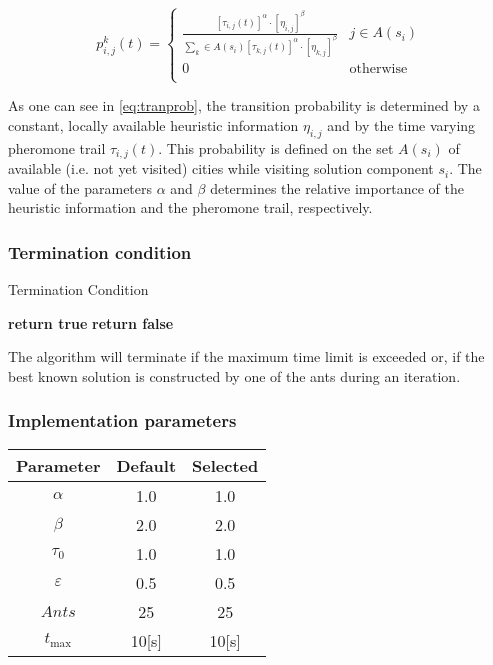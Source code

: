 \begin{homeworkProblem}
\begin{equation} 
p_{i,j}^k(t) = \begin{cases}
  \frac{[\tau_{i,j}(t)]^\alpha \cdot [\eta_{i,j}]^\beta}{\sum_{k} \in A(s_{i}) [\tau_{k,j}(t)]^\alpha \cdot [\eta_{k,j}]^\beta} & j \in A(s_{i}) \\
 0 & \text{otherwise} \\
\end{cases}
\end{equation}

As one can see in \ref{eq:tranprob}, the transition probability is determined by a constant, locally available heuristic information $\eta_{i,j}$ and by the time varying pheromone trail $\tau_{i,j}(t)$.
This probability is defined on the set $A(s_i)$ of available (i.e. not yet visited) cities while visiting solution component $s_i$.
The value of the parameters $\alpha$ and $\beta$ determines the relative importance of the heuristic information and the pheromone trail, respectively.

\subsubsection{Termination condition}
\begin{algorithm}[!h]
  \caption{Termination Condition}\label{termcond}
  \begin{algorithmic}[1]
				    \State \textbf{return true}
			    \EndIf
      \State \textbf{return false}
    \EndProcedure
\end{algorithmic}
\end{algorithm}

The algorithm will terminate if the maximum time limit is exceeded or, if the best known solution is constructed by one of the ants during an iteration.

\subsubsection{Implementation parameters}
\begin{center}
\begin{tabular}{|c|c|c|}
\hline
\textbf{Parameter} & \textbf{Default} & \textbf{Selected} \\ \hline 
$\alpha$ & 1.0 & 1.0 \\\hline
$\beta$ & 2.0 & 2.0 \\\hline 
$\tau_0$ & 1.0 & 1.0 \\ \hline
$\varepsilon$ & 0.5 & 0.5 \\ \hline 
$Ants$ & 25 & 25 \\ \hline  
$t_{\max}$ & 10[s] & 10[s] \\ \hline
\end{tabular}
\label{saParameters}
\end{center}

 
\end{homeworkProblem}
